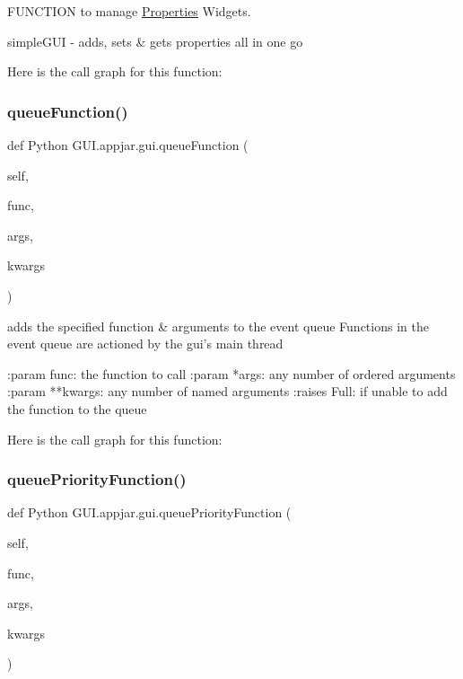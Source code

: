 \begin{DoxyVerb}
F\+U\+N\+C\+T\+I\+ON to manage \hyperlink{class_python_01_g_u_i_1_1appjar_1_1_properties}{Properties} Widgets. 

\begin{DoxyVerb}simpleGUI - adds, sets & gets properties all in one go \end{DoxyVerb}
 Here is the call graph for this function\+:
\mbox{\label{class_python_01_g_u_i_1_1appjar_1_1gui_aa1f4470e86a68404917803bdc62a6a2a}} 
\subsubsection{\texorpdfstring{queue\+Function()}{queueFunction()}}
{\footnotesize\ttfamily def Python G\+U\+I.\+appjar.\+gui.\+queue\+Function (\begin{DoxyParamCaption}\item[{}]{self,  }\item[{}]{func,  }\item[{}]{args,  }\item[{}]{kwargs }\end{DoxyParamCaption})}

\begin{DoxyVerb}adds the specified function & arguments to the event queue
Functions in the event queue are actioned by the gui's main thread

:param func: the function to call
:param *args: any number of ordered arguments
:param **kwargs: any number of named arguments
:raises Full: if unable to add the function to the queue
\end{DoxyVerb}
 Here is the call graph for this function\+:
\mbox{\label{class_python_01_g_u_i_1_1appjar_1_1gui_a007f99a59cbbd3f24f98b452fb8fec02}} 
\subsubsection{\texorpdfstring{queue\+Priority\+Function()}{queuePriorityFunction()}}
{\footnotesize\ttfamily def Python G\+U\+I.\+appjar.\+gui.\+queue\+Priority\+Function (\begin{DoxyParamCaption}\item[{}]{self,  }\item[{}]{func,  }\item[{}]{args,  }\item[{}]{kwargs }\end{DoxyParamCaption})}


\end{DoxyVerb}
